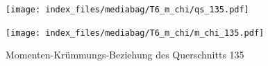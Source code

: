 \documentclass[
  11pt,
  letterpaper,
]{scrreprt}
\begin{document}
\begin{figure}[H]

\begin{minipage}{0.50\linewidth}
\texttt{[image: index\_files/mediabag/T6\_m\_chi/qs\_135.pdf]}\end{minipage}%
%
\begin{minipage}{0.50\linewidth}
\texttt{[image: index\_files/mediabag/T6\_m\_chi/m\_chi\_135.pdf]}\end{minipage}%

\caption{\label{fig-mchi_anhang}Momenten-Krümmungs-Beziehung des
Querschnitts 135}

\end{figure}%
\end{document}
